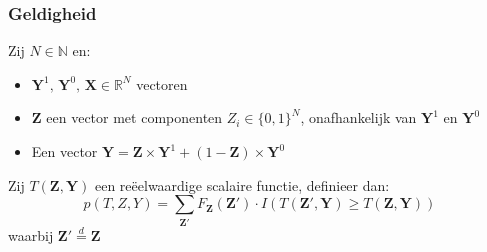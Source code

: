 \documentclass[12pt, a4paper, faculty=we]{ugent-doc}
\newcommand{\bfZ}{\textbf{Z}}
\begin{document}
\subsubsection{Geldigheid}


\begin{flushleft}
Zij $N \in \mathds{N}$ en:
\begin{itemize}
    \item $\mathbf{Y}^1, \, \mathbf{Y}^0, \, \mathbf{X}  \in \mathds{R}^N $ vectoren
    \item $\mathbf{Z}$ een vector met componenten $Z_i \in \{0,1\}^N $, onafhankelijk van $\mathbf{Y}^1$ en $\mathbf{Y}^0$
    \item Een vector $\mathbf{Y} = \mathbf{Z} \times \mathbf{Y}^1 + (1-\mathbf{Z}) \times \mathbf{Y}^0$
\end{itemize}

Zij $T(\bfZ,\mathbf{Y})$ een reëelwaardige scalaire functie, definieer dan:
\begin{equation}
    \label{eq: pRand}
    p(T,Z,Y) = \sum_{\mathbf{Z}'} F_{\mathbf{Z}}(\mathbf{Z}')\cdot I(T(\mathbf{Z}' , \mathbf{Y}) \geq T(\mathbf{Z} , \mathbf{Y}))
\end{equation}
waarbij $\mathbf{Z}' \overset{d}{=} \bfZ$
\end{flushleft}
\end{document}
